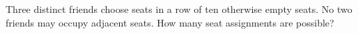 Three distinct friends choose seats in a row of ten otherwise empty seats. No two friends may occupy adjacent seats. How many seat assignments are possible?
